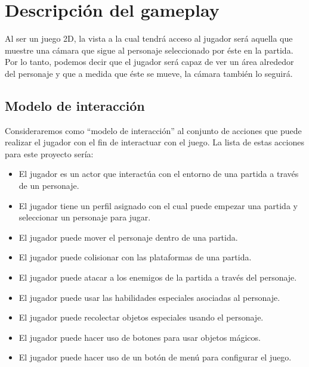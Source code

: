 \section{Descripción del gameplay} %



Al ser un juego 2D, la vista a la cual tendrá acceso al jugador será aquella que
muestre una cámara que sigue al personaje seleccionado por éste en la
partida. Por lo tanto, podemos decir que el jugador será capaz de ver un área
alrededor del personaje y que a medida que éste se mueve, la cámara también lo
seguirá.

\subsection{Modelo de interacción}

Consideraremos como “modelo de interacción” al conjunto de acciones que puede
realizar el jugador con el fin de interactuar con el juego. La lista de estas
acciones para este proyecto sería:

\begin{itemize}
    \item El jugador es un actor que interactúa con el entorno de una partida a
    través de un personaje.
    \item El jugador tiene un perfil asignado con el cual puede empezar una
    partida y seleccionar un personaje para jugar.
    \item El jugador puede mover el personaje dentro de una partida.
    \item El jugador puede colisionar con las plataformas de una partida.
    \item El jugador puede atacar a los enemigos de la partida a través del
    personaje.
    \item El jugador puede usar las habilidades especiales asociadas al
    personaje.
    \item El jugador puede recolectar objetos especiales usando el personaje.
    \item El jugador puede hacer uso de botones para usar objetos mágicos.
    \item El jugador puede hacer uso de un botón de menú para configurar el
    juego.
\end{itemize}

